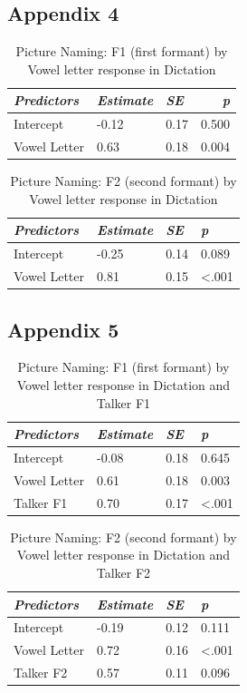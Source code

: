 \documentclass[
  english,
  man,floatsintext]{apa7}
\begin{document}
\subsection{Appendix 4}\label{appendix-4}

\begin{longtable}[t]{lllr}
\caption{\label{tab:unnamed-chunk-33}Picture Naming: F1 (first formant) by Vowel letter response in Dictation}\\
\toprule
\em{Predictors} & \em{Estimate} & \em{SE} & \em{p}\\
\midrule
Intercept & -0.12 & 0.17 & 0.500\\
Vowel Letter & 0.63 & 0.18 & 0.004\\
\bottomrule
\end{longtable}

\begin{longtable}[t]{llll}
\caption{\label{tab:unnamed-chunk-34}Picture Naming: F2 (second formant) by Vowel letter response in Dictation}\\
\toprule
\em{Predictors} & \em{Estimate} & \em{SE} & \em{p}\\
\midrule
Intercept & -0.25 & 0.14 & 0.089\\
Vowel Letter & 0.81 & 0.15 & <.001\\
\bottomrule
\end{longtable}

\subsection{Appendix 5}\label{appendix-5}

\begin{longtable}[t]{llll}
\caption{\label{tab:unnamed-chunk-35}Picture Naming: F1 (first formant) by Vowel letter response in Dictation and Talker F1}\\
\toprule
\em{Predictors} & \em{Estimate} & \em{SE} & \em{p}\\
\midrule
Intercept & -0.08 & 0.18 & 0.645\\
Vowel Letter & 0.61 & 0.18 & 0.003\\
Talker F1 & 0.70 & 0.17 & <.001\\
\bottomrule
\end{longtable}

\begin{longtable}[t]{llll}
\caption{\label{tab:unnamed-chunk-36}Picture Naming: F2 (second formant) by Vowel letter response in Dictation and Talker F2}\\
\toprule
\em{Predictors} & \em{Estimate} & \em{SE} & \em{p}\\
\midrule
Intercept & -0.19 & 0.12 & 0.111\\
Vowel Letter & 0.72 & 0.16 & <.001\\
Talker F2 & 0.57 & 0.11 & 0.096\\
\bottomrule
\end{longtable}
\end{document}
